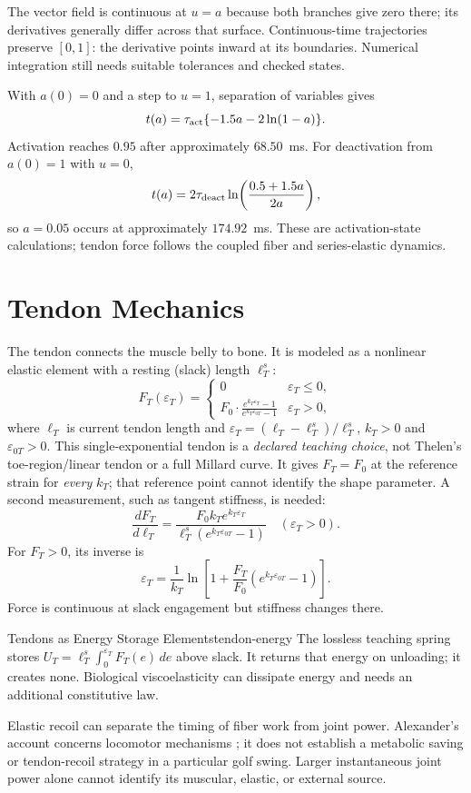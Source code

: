 The vector field is continuous at $u=a$ because both branches give zero there;
its derivatives generally differ across that surface. Continuous-time
trajectories preserve $[0,1]$: the derivative points inward at its boundaries.
Numerical integration still needs suitable tolerances and checked states.

With $a(0)=0$ and a step to $u=1$, separation of variables gives
\[
 t(a)=\tau_{\rm act}\{-1.5a-2\ln(1-a)\}.
\]
Activation reaches $0.95$ after approximately $68.50$~ms.
For deactivation from $a(0)=1$ with $u=0$,
\[
 t(a)=2\tau_{\rm deact}
 \ln\!\left(\frac{0.5+1.5a}{2a}\right),
\]
so $a=0.05$ occurs at approximately $174.92$~ms.
These are activation-state calculations; tendon force follows the coupled
fiber and series-elastic dynamics.

\section{Tendon Mechanics}

The tendon connects the muscle belly to bone. It is modeled as a nonlinear elastic
element with a resting (slack) length $\ell_T^s$:
\begin{equation}
  F_T(\varepsilon_T) = \begin{cases}
    0 & \varepsilon_T \leq 0, \\
    F_0 \cdot \frac{e^{k_T \varepsilon_T} - 1}{e^{k_T \varepsilon_{0T}} - 1} &
    \varepsilon_T > 0,
  \end{cases}
  \label{eq:ch3:tendon-force}
\end{equation}
where $\ell_T$ is current tendon length and
$\varepsilon_T=(\ell_T-\ell_T^s)/\ell_T^s$,
$k_T>0$ and $\varepsilon_{0T}>0$. This single-exponential tendon is a
\emph{declared teaching choice}, not Thelen's toe-region/linear tendon or a
full Millard curve. It gives $F_T=F_0$ at the reference strain for \emph{every}
$k_T$; that reference point cannot identify the shape parameter.
A second measurement, such as tangent stiffness, is needed:
\[
 \frac{dF_T}{d\ell_T}
 =\frac{F_0 k_T e^{k_T\varepsilon_T}}
 {\ell_T^s(e^{k_T\varepsilon_{0T}}-1)}
 \quad(\varepsilon_T>0).
\]
For $F_T>0$, its inverse is
\[
 \varepsilon_T=\frac{1}{k_T}
 \ln\!\left[1+\frac{F_T}{F_0}
 (e^{k_T\varepsilon_{0T}}-1)\right].
\]
Force is continuous at slack engagement but stiffness changes there.

\begin{principle}{Tendons as Energy Storage Elements}{tendon-energy}
 The lossless teaching spring stores
 $U_T=\ell_T^s\int_0^{\varepsilon_T}F_T(e)\,de$ above slack.
 It returns that energy on unloading; it creates none. Biological
 viscoelasticity can dissipate energy and needs an additional constitutive law.

 Elastic recoil can separate the timing of fiber work from joint power.
 Alexander's account concerns locomotor mechanisms \cite{Alexander2002};
 it does not establish a metabolic saving or tendon-recoil strategy in a
 particular golf swing. Larger instantaneous joint power alone cannot
 identify its muscular, elastic, or external source.
\end{principle}

